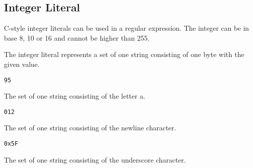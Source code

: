 
\subsection{Integer Literal}
{
	C-style integer literals can be used in a regular expression.
	The integer can be in base 8, 10 or 16 and cannot be higher than 255.
	
	The integer literal represents a set of one string consisting of one byte
	with the given value.
	
	\begin{itemize}
	{
		\item[] \texttt{95}
		
			The set of one string consisting of the letter a.
		
		\item[] \texttt{012}
		
			The set of one string consisting of the
			newline character.
		
		\item[] \texttt{0x5F}
		
			The set of one string consisting of the
			underscore character.
	}
	\end{itemize}
}
